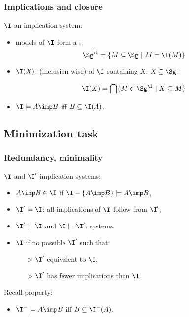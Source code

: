 \begin{frame}
\frametitle{Implications and closure}

$\I$ an implication system:
\begin{itemize}
\item models of $\I$ form a :
\[ \Sg^{\I} = \{ M \subseteq \Sg \ | \ M = \I(M) \} \]

\vspace{1.2em}

\item {} $\I(X)$:  (inclusion wise) of $\I$ containing $X$, $X \subseteq \Sg$: 

\[ \I(X) = \bigcap \{ M \in \Sg^{\I} \ | \ X \subseteq M \} \]

\item $\I \models A \imp B$ iff $B \subseteq \I(A)$.
\end{itemize}

\end{frame}



\subsection{Minimization task}

\begin{frame}
\frametitle{Redundancy, minimality}

$\I$ and $\I'$ implication systems:
\begin{itemize}
	\item $A \imp B \in \I$  if $\I - \{A \imp B\} \models A \imp B$,
	\item $\I' \models \I$: all implications of $\I$ follow from $\I'$,
	\item $\I' \models \I$ and $\I \models \I'$:  systems.
	\item $\I$  if no possible $\I'$ such that:
		\begin{itemize}
			\item[\color{belize} $\triangleright$] $\I'$ equivalent to $\I$,
			\item[\color{belize} $\triangleright$] $\I'$ has fewer implications than $\I$.
		\end{itemize}
\end{itemize}

\vspace{0.8em}

\begin{lightreminder}
	Recall property: 
	\begin{itemize}
		\item $\I^{-} \models A \imp B$ iff $B \subseteq \I^{-}(A)$.
	\end{itemize}
\end{lightreminder}

\end{frame}

